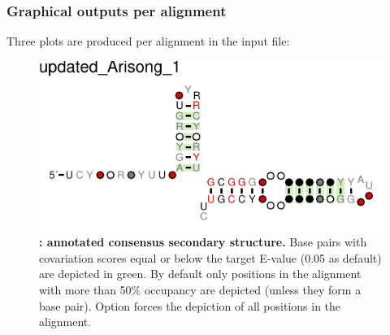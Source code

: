 \clearpage
\subsubsection{Graphical outputs per alignment}
 Three plots are produced per alignment in the input file: 

 \begin{figure}[h]
   \includegraphics[scale=1.5]{Arisong_R2R.pdf} 
 \caption{\small\textbf{:
     annotated consensus secondary structure.} Base pairs with
   covariation scores equal or below the target E-value (0.05 as
   default) are depicted in green. By default only positions in the
   alignment with more than 50\% occupancy are depicted (unless they form
   a base pair). Option  forces the depiction of all
   positions in the alignment.  }
 \label{fig:r2r}
 \end{figure}

